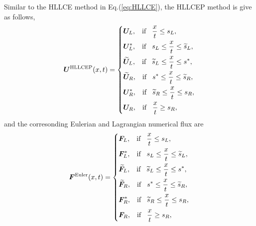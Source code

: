 \documentclass{article}
\theoremstyle{plain}\newtheorem{definition}{\sc{Definition}}
\theoremstyle{defination}\newtheorem{example}{Example}[section]
\numberwithin{equation}{section}
\numberwithin{table}{section}
\begin{document}
Similar to the HLLCE method in Eq.(\ref{eq:HLLCE}), the HLLCEP method is give as follows,
  \begin{equation}\label{eq:HLLCEP}
	\bm{U}^{\text{HLLCEP}}(x,t) = \left\{ \begin{aligned}
		& \bm{U}_L, \hspace{0.3cm} \text{if} \hspace{0.3cm} \frac{x}{t}\le s_L, \\
		& \bm{U}_L^*, \hspace{0.3cm} \text{if} \hspace{0.3cm} s_L\le \frac{x}{t} \le \widetilde{s}_L, \\
		& \widetilde{\bm{U}}_L, \hspace{0.3cm} \text{if} \hspace{0.3cm} \widetilde{s}_L\le \frac{x}{t} \le s^*, \\
		& \widetilde{\bm{U}}_R, \hspace{0.3cm} \text{if} \hspace{0.3cm} s^*\le \frac{x}{t} \le \widetilde{s}_R, \\
		& \bm{U}_R^*, \hspace{0.3cm} \text{if} \hspace{0.3cm} \widetilde{s}_R\le \frac{x}{t} \le s_R,\\
		& \bm{U}_R, \hspace{0.3cm} \text{if} \hspace{0.3cm} \frac{x}{t}\ge s_R, \\
	  \end{aligned}
	\right.
  \end{equation}
  and the corresonding Eulerian and Lagrangian numerical flux are 
 \begin{equation}\label{eq:HLLCEP}
	\bm{F}^{\text{Euler}}(x,t) = \left\{ \begin{aligned}
		& \bm{F}_L, \hspace{0.3cm} \text{if} \hspace{0.3cm} \frac{x}{t}\le s_L, \\
		& \bm{F}_L^*, \hspace{0.3cm} \text{if} \hspace{0.3cm} s_L\le \frac{x}{t} \le \widetilde{s}_L, \\
		& \widetilde{\bm{F}}_L, \hspace{0.3cm} \text{if} \hspace{0.3cm} \widetilde{s}_L\le \frac{x}{t} \le s^*, \\
		& \widetilde{\bm{F}}_R, \hspace{0.3cm} \text{if} \hspace{0.3cm} s^*\le \frac{x}{t} \le \widetilde{s}_R, \\
		& \bm{F}_R^*, \hspace{0.3cm} \text{if} \hspace{0.3cm} \widetilde{s}_R\le \frac{x}{t} \le s_R,\\
		& \bm{F}_R, \hspace{0.3cm} \text{if} \hspace{0.3cm} \frac{x}{t}\ge s_R, \\
	  \end{aligned}
	\right.
  \end{equation}
\end{document}
